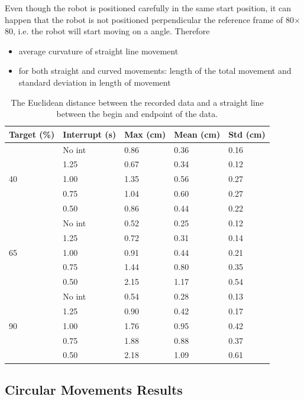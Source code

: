 Even though the robot is positioned carefully in the same start position, it can happen that the robot is not positioned perpendicular the reference frame of 80$\times$80\cm, i.e. the robot will start moving on a angle.
Therefore 

\begin{itemize}
	\item average curvature of straight line movement

	\item for both straight and curved movements: length of the total movement and  standard deviation in length of movement
\end{itemize}


\begin{table}[t]
	\centering
	\caption{The Euclidean distance between the recorded data and a straight line between the begin and endpoint of the data.}
	\label{tab:straight_results}
	\begin{tabular}{|l|l||l|l|l|}
		\hline
		Target (\%) & Interrupt (s) & Max (cm) & Mean (cm) & Std (cm)\\
		\hline \hline
		\multirow{5}{*}{40} & No int & 0.86 & 0.36 & 0.16 \\
		& 1.25 & 0.67 & 0.34 & 0.12 \\
		& 1.00 & 1.35 & 0.56 & 0.27 \\
		& 0.75 & 1.04 & 0.60 & 0.27 \\
		& 0.50 & 0.86 & 0.44 & 0.22 \\
		\hline
		\multirow{5}{*}{65} & No int & 0.52 & 0.25 & 0.12 \\
		& 1.25 & 0.72 & 0.31 & 0.14 \\
		& 1.00 & 0.91 & 0.44 & 0.21 \\
		& 0.75 & 1.44 & 0.80 & 0.35 \\
		& 0.50 & 2.15 & 1.17 & 0.54 \\
		\hline
		\multirow{5}{*}{90} & No int & 0.54 & 0.28 & 0.13 \\
		& 1.25 & 0.90 & 0.42 & 0.17 \\
		& 1.00 & 1.76 & 0.95 & 0.42 \\
		& 0.75 & 1.88 & 0.88 & 0.37 \\
		& 0.50 & 2.18 & 1.09 & 0.61 \\
		\hline
	\end{tabular}
\end{table}

\subsection{Circular Movements Results}

